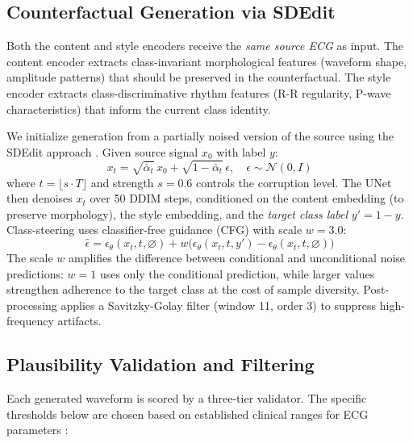 \documentclass[conference]{IEEEtran}
\begin{document}
\begin{figure}[t]
\label{fig:architecture}
\end{figure}

\subsection{Counterfactual Generation via SDEdit}

Both the content and style encoders receive the \textit{same source ECG} as input. The content encoder extracts class-invariant morphological features (waveform shape, amplitude patterns) that should be preserved in the counterfactual. The style encoder extracts class-discriminative rhythm features (R-R regularity, P-wave characteristics) that inform the current class identity.

We initialize generation from a partially noised version of the source using the SDEdit approach \cite{meng2022sdedit}. Given source signal $x_0$ with label $y$:
\begin{equation}
x_t = \sqrt{\bar{\alpha}_t}\, x_0 + \sqrt{1 - \bar{\alpha}_t}\, \epsilon, \quad \epsilon \sim \mathcal{N}(0, I)
\end{equation}
where $t = \lfloor s \cdot T \rfloor$ and strength $s{=}0.6$ controls the corruption level. The UNet then denoises $x_t$ over 50 DDIM steps, conditioned on the content embedding (to preserve morphology), the style embedding, and the \textit{target class label} $y' = 1 - y$. Class-steering uses classifier-free guidance (CFG) with scale $w{=}3.0$:
\begin{equation}
\hat{\epsilon} = \epsilon_\theta(x_t, t, \varnothing) + w\bigl(\epsilon_\theta(x_t, t, y') - \epsilon_\theta(x_t, t, \varnothing)\bigr)
\end{equation}
The scale $w$ amplifies the difference between conditional and unconditional noise predictions: $w{=}1$ uses only the conditional prediction, while larger values strengthen adherence to the target class at the cost of sample diversity. Post-processing applies a Savitzky-Golay filter \cite{savgol} (window 11, order 3) to suppress high-frequency artifacts.

\subsection{Plausibility Validation and Filtering}

Each generated waveform is scored by a three-tier validator. The specific thresholds below are chosen based on established clinical ranges for ECG parameters \cite{clifford2006}:
\end{document}
